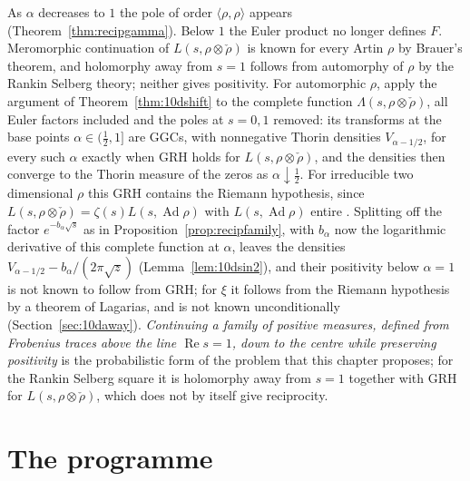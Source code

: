 As $\alpha$ decreases to $1$ the pole of order $\langle\rho,\rho\rangle$ appears (Theorem~\ref{thm:recipgamma}). Below $1$ the Euler product no longer defines $F$. Meromorphic continuation of $L(s,\rho\otimes\check\rho)$ is known for every Artin $\rho$ by Brauer's theorem, and holomorphy away from $s=1$ follows from automorphy of $\rho$ by the Rankin Selberg theory; neither gives positivity. For automorphic $\rho$, apply the argument of Theorem~\ref{thm:10dshift} to the complete function $\Lambda(s,\rho\otimes\check\rho)$, all Euler factors included and the poles at $s=0,1$ removed: its transforms at the base points $\alpha\in(\frac12,1]$ are GGCs, with nonnegative Thorin densities $V_{\alpha-1/2}$, for every such $\alpha$ exactly when GRH holds for $L(s,\rho\otimes\check\rho)$, and the densities then converge to the Thorin measure of the zeros as $\alpha\downarrow\frac12$. For irreducible two dimensional $\rho$ this GRH contains the Riemann hypothesis, since $L(s,\rho\otimes\check\rho)=\zeta(s)L(s,\operatorname{Ad}\rho)$ with $L(s,\operatorname{Ad}\rho)$ entire \cite{gelbartjacquet1978}. Splitting off the factor $e^{-b_\alpha\sqrt s}$ as in Proposition~\ref{prop:recipfamily}, with $b_\alpha$ now the logarithmic derivative of this complete function at $\alpha$, leaves the densities $V_{\alpha-1/2}-b_\alpha/(2\pi\sqrt z)$ (Lemma~\ref{lem:10dsin2}), and their positivity below $\alpha=1$ is not known to follow from GRH; for $\xi$ it follows from the Riemann hypothesis by a theorem of Lagarias, and is not known unconditionally (Section~\ref{sec:10daway}). \emph{Continuing a family of positive measures, defined from Frobenius traces above the line $\operatorname{Re}s=1$, down to the centre while preserving positivity} is the probabilistic form of the problem that this chapter proposes; for the Rankin Selberg square it is holomorphy away from $s=1$ together with GRH for $L(s,\rho\otimes\check\rho)$, which does not by itself give reciprocity.

\section{The programme}\label{sec:recipprogramme}

